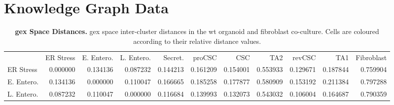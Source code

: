 \newpage
\newpage
\newpage
\section{Knowledge Graph Data}

\label{lst:wavpy}


\begin{table}
    \centering
    \caption{\textbf{\acrshort{gex} Space Distances.} \acrshort{gex} space inter-cluster distances in the \acrshort{wt} organoid and fibroblast co-culture. Cells are coloured according to their relative distance values.}
    \label{tab:kgdistge}
    \begin{tabular}{lrrrrrrrrrr}
        {} & {ER Stress} & {E. Entero.} & {L. Entero.} & {Secret.} & {proCSC} & {CSC} & {TA2} & {revCSC} & {TA1} & {Fibroblast} \\
        ER Stress & {\cellcolor[HTML]{000004}} \color[HTML]{F1F1F1} 0.000000 & {\cellcolor[HTML]{240C4F}} \color[HTML]{F1F1F1} 0.134136 & {\cellcolor[HTML]{120A32}} \color[HTML]{F1F1F1} 0.087232 & {\cellcolor[HTML]{280B53}} \color[HTML]{F1F1F1} 0.144213 & {\cellcolor[HTML]{310A5C}} \color[HTML]{F1F1F1} 0.161209 & {\cellcolor[HTML]{2D0B59}} \color[HTML]{F1F1F1} 0.154001 & {\cellcolor[HTML]{CE4347}} \color[HTML]{F1F1F1} 0.553933 & {\cellcolor[HTML]{230C4C}} \color[HTML]{F1F1F1} 0.129671 & {\cellcolor[HTML]{3D0965}} \color[HTML]{F1F1F1} 0.187844 & {\cellcolor[HTML]{FA9207}} \color[HTML]{000000} 0.759904 \\
        E. Entero. & {\cellcolor[HTML]{240C4F}} \color[HTML]{F1F1F1} 0.134136 & {\cellcolor[HTML]{000004}} \color[HTML]{F1F1F1} 0.000000 & {\cellcolor[HTML]{1B0C41}} \color[HTML]{F1F1F1} 0.110047 & {\cellcolor[HTML]{320A5E}} \color[HTML]{F1F1F1} 0.166665 & {\cellcolor[HTML]{3B0964}} \color[HTML]{F1F1F1} 0.185258 & {\cellcolor[HTML]{380962}} \color[HTML]{F1F1F1} 0.177877 & {\cellcolor[HTML]{D74B3F}} \color[HTML]{F1F1F1} 0.580909 & {\cellcolor[HTML]{2D0B59}} \color[HTML]{F1F1F1} 0.153192 & {\cellcolor[HTML]{470B6A}} \color[HTML]{F1F1F1} 0.211384 & {\cellcolor[HTML]{FCA50A}} \color[HTML]{000000} 0.797288 \\
        L. Entero. & {\cellcolor[HTML]{120A32}} \color[HTML]{F1F1F1} 0.087232 & {\cellcolor[HTML]{1B0C41}} \color[HTML]{F1F1F1} 0.110047 & {\cellcolor[HTML]{000004}} \color[HTML]{F1F1F1} 0.000000 & {\cellcolor[HTML]{1C0C43}} \color[HTML]{F1F1F1} 0.116684 & {\cellcolor[HTML]{260C51}} \color[HTML]{F1F1F1} 0.139993 & {\cellcolor[HTML]{230C4C}} \color[HTML]{F1F1F1} 0.132073 & {\cellcolor[HTML]{CB4149}} \color[HTML]{F1F1F1} 0.543032 & {\cellcolor[HTML]{190C3E}} \color[HTML]{F1F1F1} 0.106004 & {\cellcolor[HTML]{320A5E}} \color[HTML]{F1F1F1} 0.164687 & {\cellcolor[HTML]{FCA108}} \color[HTML]{000000} 0.790359 \\

\end{tabular}
\end{table}
